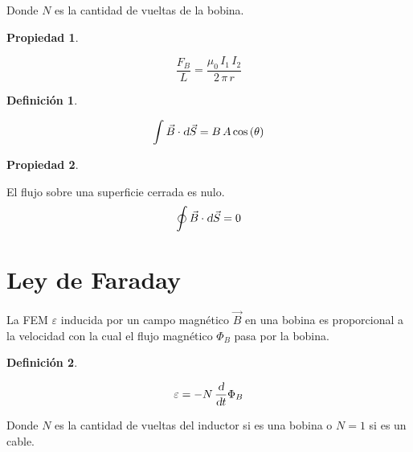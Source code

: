 \documentclass[a5paper,12pt,twoside]{book}
\newtheorem{defn}{{Definición}}[chapter]
\newtheorem{prop}{{Propiedad}}[chapter]
\begin{document}
Donde $N$ es la cantidad de vueltas de la bobina.

\begin{mdframed}[style=MyFrame1]
    \begin{prop}
    \end{prop}
    \begin{equation*}
        \dfrac{F_B}{L}=\frac{\mu_0 \, I_1 \, I_2}{2 \, \pi \, r}
    \end{equation*}
\end{mdframed}

\begin{mdframed}[style=MyFrame1]
    \begin{defn}
    \end{defn}
    \begin{equation*}
        \int \Vec{B} \cdot \textsl{d} \Vec{S} = B \, A \cos\left(\theta\right)
    \end{equation*}
\end{mdframed}

\begin{mdframed}[style=MyFrame1]
    \begin{prop}
    \end{prop}
    El flujo sobre una superficie cerrada es nulo.
    \begin{equation*}
        \oint \Vec{B} \cdot \textsl{d} \Vec{S} = 0
    \end{equation*}
\end{mdframed}


\section*{Ley de Faraday}

La FEM $\varepsilon$ inducida por un campo magnético $\Vec{B}$ en una bobina es proporcional a la velocidad con la cual el flujo magnético $\Phi_B$ pasa por la bobina.

\begin{mdframed}[style=MyFrame1]
    \begin{defn}
    \end{defn}
    \begin{equation*}
        \varepsilon = - N \, \frac{\textsl{d}}{\textsl{d} t} \Phi_B
    \end{equation*}
\end{mdframed}

Donde $N$ es la cantidad de vueltas del inductor si es una bobina o $N=1$ si es un cable.
\end{document}
